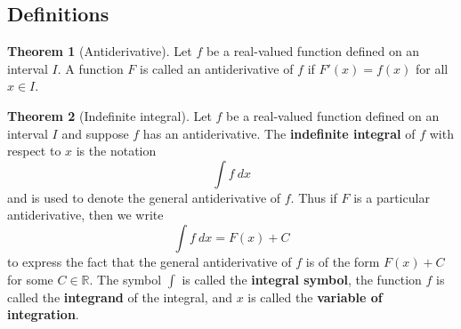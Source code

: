 \documentclass[11pt]{article}
\theoremstyle{definition}
\theoremstyle{named}
\newtheorem*{namedtheorem}{Theorem}
\numberwithin{myalgctr}{section}
\begin{document}
\thispagestyle{fancy}
\subsection*{Definitions}
\begin{namedtheorem}[Antiderivative] Let $f$ be a real-valued function defined on an interval $I$. A function $F$ is called an antiderivative of $f$ if $F'(x)=f(x)$ for all $x\in I$.
\end{namedtheorem}

\begin{namedtheorem}[Indefinite integral] Let $f$ be a real-valued function defined on an interval $I$ and suppose $f$ has an antiderivative. The {\bf indefinite integral} of $f$ with respect to $x$ is the notation
  \[
  \int f \ dx
  \]
and is used to denote the general antiderivative of $f$. Thus if $F$ is a particular antiderivative, then we write
\[
\int f \ dx=F(x)+C
\]
to express the fact that the general antiderivative of $f$ is of the form $F(x)+C$ for some $C\in \mathbb{R}$. The symbol $\int$ is called the {\bf integral symbol}, the function $f$ is called the {\bf integrand} of the integral, and $x$ is called the {\bf variable of integration}.
\end{namedtheorem}
\end{document}
